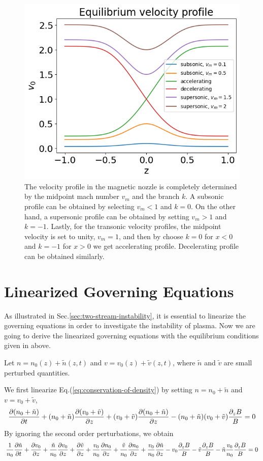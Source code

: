 \begin{figure}[H]
	\centering
	\includegraphics[width=0.7\linewidth]{img/velocity-profiles}
	\caption{The velocity profile in the magnetic nozzle is completely determined by the midpoint mach number $v_m$ and the branch $k$. A subsonic profile can be obtained by selecting $v_m<1$ and $k=0$. On the other hand, a supersonic profile can be obtained by setting $v_m>1$ and $k=-1$. Lastly, for the transonic velocity profiles, the midpoint velocity is set to unity, $v_m=1$, and then by choose $k=0$ for $x<0$ and $k=-1$ for $x>0$ we get accelerating profile. Decelerating profile can be obtained similarly.}
	\label{fig:velocity-profiles}
\end{figure}

\section{Linearized Governing Equations}
As illustrated in Sec.\ref{sec:two-stream-instability}, it is essential to linearize the governing equations in order to investigate the instability of plasma. Now we are going to derive the linearized governing equations with the equilibrium conditions given in above.

Let $n = n_0(z) + \tilde{n}(z,t)$ and $v = v_0(z) + \tilde{v}(z,t)$, where $\tilde{n}$ and $\tilde{v}$ are small perturbed quantities.

We first linearize Eq.(\ref{eq:conservation-of-density}) by setting $n=n_0+\tilde{n}$ and $v=v_0+\tilde{v}$,
\[    \pdv{(n_0+\tilde{n})}{t}
	+ (n_0+\tilde{n})\pdv{(v_0+\tilde{v})}{z}
	+ (v_0+\tilde{v})\pdv{(n_0+\tilde{n})}{z}
	- (n_0+\tilde{n})(v_0+\tilde{v})\frac{\partial_z B}{B} = 0
\]
By ignoring the second order perturbations, we obtain
\[ \frac{1}{n_0}\pdv{\tilde{n}}{t}
	+ \pdv{v_0}{z} + \frac{\tilde{n}}{n_0}\pdv{v_0}{z} + \pdv{\tilde{v}}{z}
	+ \frac{v_0}{n_0}\pdv{n_0}{z} + \frac{\tilde{v}}{n_0}\pdv{n_0}{z} + \frac{v_0}{n_0}\pdv{\tilde{n}}{z}
	- v_0\frac{\partial_z B}{B} - \tilde{v}\frac{\partial_z B}{B} - \tilde{n}\frac{v_0}{n_0}\frac{\partial_z B}{B} = 0
\]


